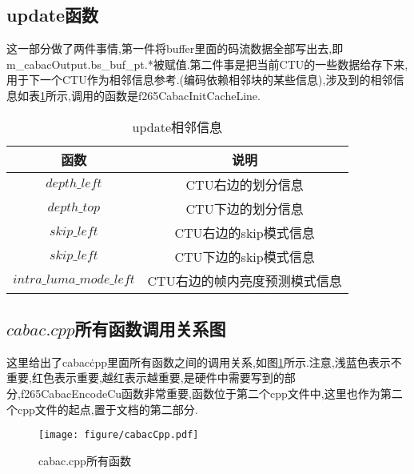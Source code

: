\documentclass[UTF8,a4paper,12pt]{ctexart}
\newcommand{\wuhao}{\fontsize{10.5pt}{10.5pt}\selectfont}
\begin{document}
\subsection{update函数}
这一部分做了两件事情,第一件将buffer里面的码流数据全部写出去,即 \\
m\_cabacOutput.bs\_buf\_pt.*被赋值.第二件事是把当前CTU的一些数据给存下来,用于下一个CTU作为相邻信息参考.(编码依赖相邻块的某些信息),涉及到的相邻信息如表\ref{tab2}所示,调用的函数是f265CabacInitCacheLine.
\begin{table}[H] \wuhao             %
   \centering
  \caption{update相邻信息}\label{tab2}
  \begin{tabular}{c|c}
    \toprule                  %
    函数 & 说明 \\
    \hline                  %
    $depth\_left$ & CTU右边的划分信息 \\
    $depth\_top$ & CTU下边的划分信息 \\
    $skip\_left$ & CTU右边的skip模式信息 \\
    $skip\_left$ & CTU下边的skip模式信息 \\
    $intra\_luma\_mode\_left$ & CTU右边的帧内亮度预测模式信息 \\
    \bottomrule                %
  \end{tabular}
\end{table}

\subsection{$cabac.cpp$所有函数调用关系图}
这里给出了cabac\.cpp里面所有函数之间的调用关系,如图\ref{fig4}所示.注意,浅蓝色表示不重要,红色表示重要,越红表示越重要,是硬件中需要写到的部分,f265CabacEncodeCu函数非常重要,函数位于第二个cpp文件中,这里也作为第二个cpp文件的起点,置于文档的第二部分.
\begin{figure}[H]
\centering
\texttt{[image: figure/cabacCpp.pdf]}
\caption{cabac.cpp所有函数}\label{fig4}
\end{figure}
 
\end{document}
